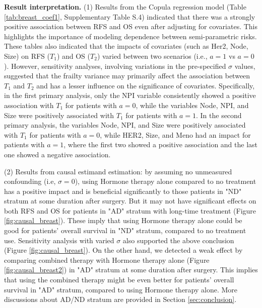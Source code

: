 \documentclass[APA,Times1COL]{WileyNJDv5} %
\theoremstyle{plain}
\begin{document}
\textbf{Result interpretation.} (1) Results from the Copula regression model (Table \ref{tab:breast_coef1}, Supplementary Table S.4) indicated that there was a strongly positive association between RFS and OS even after adjusting for covariates. This highlights the importance of modeling dependence between semi-parametric risks. These tables also indicated that the impacts of covariates (such as Her2, Node, Size) on RFS ($T_1$) and OS ($T_2$) varied between two scenarios (i.e., $a=1$ vs $a=0$). However, sensitivity analyses, involving variations in the pre-specified $\sigma$ values, suggested that the frailty variance may primarily affect the association between $T_1$ and $T_2$ and has a lesser influence on the significance of covariates.  Specifically, in the first primary analysis, only the NPI variable consistently showed a positive association with $T_1$ for patients with $a=0$, while the variables Node, NPI, and Size were positively associated with $T_1$ for patients with $a=1$. In the second primary analysis, the variables Node, NPI, and Size were positively associated with $T_1$ for patients with $a=0$, while HER2, Size, and Meno had an impact for patients with $a=1$, where the first two showed a positive association and the last one showed a negative association. 

(2) Results from causal estimand estimation: by assuming no unmeasured confounding (i.e, $\sigma=0$), using Hormone therapy alone compared to no treatment has a positive impact and is beneficial significantly to those patients in "ND" stratum at some duration after surgery. But it may not have significant effects on both RFS and OS for patients in "AD" stratum with long-time treatment (Figure \ref{fig:causal_breast}). These imply that using Hormone therapy alone could be good for patients' overall survival in "ND" stratum, compared to no treatment use. Sensitivity analysis with varied $\sigma$ also supported the above conclusion (Figure \ref{fig:causal_breast}). On the other hand, we detected a weak effect by comparing combined therapy with Hormone therapy alone (Figure \ref{fig:causal_breast2}) in "AD" stratum at some duration after surgery. This implies that using the combined therapy might be even better for patients' overall survival in "AD" stratum, compared to using Hormone therapy alone. {More discussions about AD/ND stratum are provided in Section \ref{sec:conclusion}.}

\end{document}
